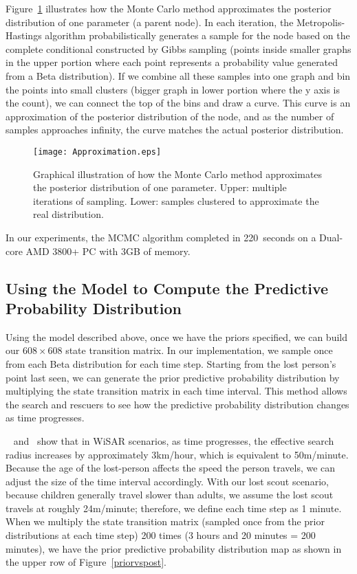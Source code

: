 \documentclass[smallextended,natbib]{svjour3}
\begin{document}
Figure~\ref{Approximation} illustrates how the Monte Carlo method approximates the posterior distribution of one parameter (a parent node). In each iteration, the Metropolis-Hastings algorithm probabilistically generates a sample for the node based on the complete conditional constructed by Gibbs sampling (points inside smaller graphs in the upper portion where each point represents a probability value generated from a Beta distribution). If we combine all these samples into one graph and bin the points into small clusters (bigger graph in lower portion where the y axis is the count), we can connect the top of the bins and draw a curve. This curve is an approximation of the posterior distribution of the node, and as the number of samples approaches infinity, the curve matches the actual posterior distribution.

\begin{figure}
\centering
\texttt{[image: Approximation.eps]}
\caption{Graphical illustration of how the Monte Carlo method approximates the posterior distribution of one parameter. Upper: multiple iterations of sampling. Lower: samples clustered to approximate the real distribution.}
\label{Approximation}
\end{figure}

In our experiments, the MCMC algorithm completed in 220~seconds on a Dual-core AMD 3800+ PC with 3GB of memory.

\subsection{Using the Model to Compute the Predictive Probability Distribution}
\label{sec:3.6}

Using the model described above, once we have the priors specified, we can build our $608 \times 608$ state transition matrix. In our implementation, we sample once from each Beta distribution for each time step. Starting from the lost person's point last seen, we can generate the prior predictive probability distribution by multiplying the state transition matrix in each time interval. This method allows the search and rescuers to see how the predictive probability distribution changes as time progresses.

~\cite{[01UAVSpecific]SetnickaWiSAR} and~\cite{[01UAVSpecific]SyrotuckIntroToLandSearch} show that in WiSAR scenarios, as time progresses, the effective search radius increases by approximately 3km/hour, which is equivalent to 50m/minute. Because the age of the lost-person affects the speed the person travels, we can adjust the size of the time interval accordingly. With our lost scout scenario, because children generally travel slower than adults, we assume the lost scout travels at roughly 24m/minute; therefore, we define each time step as 1 minute. When we multiply the state transition matrix (sampled once from the prior distributions at each time step) 200 times (3 hours and 20 minutes = 200 minutes), we have the prior predictive probability distribution map as shown in the upper row of Figure~\ref{priorvspost}.
\end{document}
